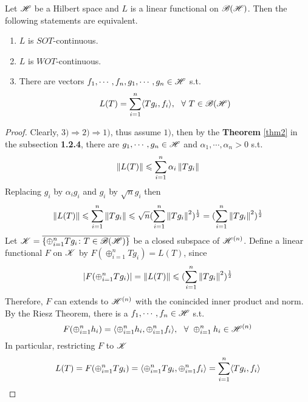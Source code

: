 \documentclass[a4paper,11pt]{report}
\begin{document}
\begin{prop}
	Let $\mathscr{H}$ be a Hilbert space and $L$ is a linear functional on $\mathscr{B(H)}$. Then the following statements are equivalent.
	\begin{enumerate}[label=\arabic*)]
		\item $L$ is $SOT$-continuous.
		\item $L$ is $WOT$-continuous.
		\item There are vectors $f_1,\cdots,f_n,g_1,\cdots,g_n \in \mathscr{H}$ s.t.
		\begin{equation*}
			L(T) = \sum_{i=1}^{n} \langle Tg_i,f_i \rangle,~~\forall~T \in \mathscr{B(H)}
		\end{equation*}
	\end{enumerate}
\end{prop}
\begin{proof}
	Clearly, $3) \Rightarrow 2) \Rightarrow 1)$, thus assume $1)$, then by the \textbf{Theorem} \ref{thm2} in the subsection \textbf{1.2.4}, there are $g_1,\cdots,g_n \in \mathscr{H}$ and $\alpha_1,\cdots,\alpha_n > 0$ s.t.
	\begin{equation*}
		\left\lVert L(T)\right\lVert \leqslant \sum_{i=1}^{n} \alpha_i \left\lVert Tg_i\right\lVert
	\end{equation*}
	Replacing $g_i$ by $\alpha_i g_i$ and $g_i$ by $\sqrt{n} g_i$ then
	\begin{equation*}
		\left\lVert L(T)\right\lVert \leqslant \sum_{i=1}^{n} \left\lVert Tg_i\right\lVert \leqslant \sqrt{n}(\sum_{i=1}^{n} \left\lVert Tg_i\right\lVert^2)^{\frac{1}{2}} = (\sum_{i=1}^{n} \left\lVert Tg_i\right\lVert^2)^{\frac{1}{2}}
	\end{equation*}
	Let $\mathscr{K} = \overline{\{\oplus_{i=1}^{n}Tg_i \colon T \in \mathscr{B(H)}\}}$ be a closed subspace of $\mathscr{H}^{(n)}$. 
	Define a linear functional $F$ on $\mathscr{K}$ by $F(\oplus_{i=1}^{n}Tg_i) = L(T)$, since
	\begin{equation*}
		\left\lvert F(\oplus_{i=1}^{n}Tg_i)\right\lvert = \left\lVert L(T)\right\lVert \leqslant (\sum_{i=1}^{n} \left\lVert Tg_i\right\lVert^2)^{\frac{1}{2}}
	\end{equation*}
	Therefore, $F$ can extends to $\mathscr{H}^{(n)}$ with the conincided inner product and norm. By the Riesz Theorem, there is a $f_1, \cdots, f_n \in \mathscr{H}$ s.t.
	\begin{equation*}
		F(\oplus_{i=1}^{n}h_i) = \langle \oplus_{i=1}^{n}h_i, \oplus_{i=1}^{n}f_i \rangle,~~\forall~\oplus_{i=1}^{n}h_i \in \mathscr{H}^{(n)}
	\end{equation*}
	In particular, restricting $F$ to $\mathscr{K}$
	\begin{equation*}
		L(T) = F(\oplus_{i=1}^{n}Tg_i) = \langle \oplus_{i=1}^{n}Tg_i, \oplus_{i=1}^{n}f_i \rangle = \sum_{i=1}^{n} \langle Tg_i,f_i \rangle \qedhere
	\end{equation*}

\end{proof}
\end{document}
